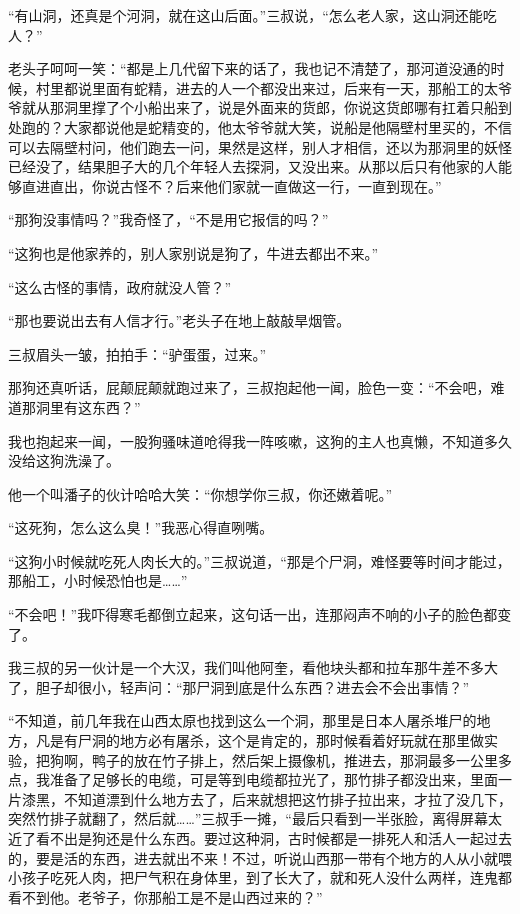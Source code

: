 “有山洞，还真是个河洞，就在这山后面。”三叔说，“怎么老人家，这山洞还能吃人？”

老头子呵呵一笑：“都是上几代留下来的话了，我也记不清楚了，那河道没通的时候，村里都说里面有蛇精，进去的人一个都没出来过，后来有一天，那船工的太爷爷就从那洞里撑了个小船出来了，说是外面来的货郎，你说这货郎哪有扛着只船到处跑的？大家都说他是蛇精变的，他太爷爷就大笑，说船是他隔壁村里买的，不信可以去隔壁村问，他们跑去一问，果然是这样，别人才相信，还以为那洞里的妖怪已经没了，结果胆子大的几个年轻人去探洞，又没出来。从那以后只有他家的人能够直进直出，你说古怪不？后来他们家就一直做这一行，一直到现在。”

“那狗没事情吗？”我奇怪了，“不是用它报信的吗？”

“这狗也是他家养的，别人家别说是狗了，牛进去都出不来。”

“这么古怪的事情，政府就没人管？”

“那也要说出去有人信才行。”老头子在地上敲敲旱烟管。

三叔眉头一皱，拍拍手：“驴蛋蛋，过来。”

那狗还真听话，屁颠屁颠就跑过来了，三叔抱起他一闻，脸色一变：“不会吧，难道那洞里有这东西？”

我也抱起来一闻，一股狗骚味道呛得我一阵咳嗽，这狗的主人也真懒，不知道多久没给这狗洗澡了。

他一个叫潘子的伙计哈哈大笑：“你想学你三叔，你还嫩着呢。”

“这死狗，怎么这么臭！”我恶心得直咧嘴。

“这狗小时候就吃死人肉长大的。”三叔说道，“那是个尸洞，难怪要等时间才能过，那船工，小时候恐怕也是……”

“不会吧！”我吓得寒毛都倒立起来，这句话一出，连那闷声不响的小子的脸色都变了。

我三叔的另一伙计是一个大汉，我们叫他阿奎，看他块头都和拉车那牛差不多大了，胆子却很小，轻声问：“那尸洞到底是什么东西？进去会不会出事情？”

“不知道，前几年我在山西太原也找到这么一个洞，那里是日本人屠杀堆尸的地方，凡是有尸洞的地方必有屠杀，这个是肯定的，那时候看着好玩就在那里做实验，把狗啊，鸭子的放在竹子排上，然后架上摄像机，推进去，那洞最多一公里多点，我准备了足够长的电缆，可是等到电缆都拉光了，那竹排子都没出来，里面一片漆黑，不知道漂到什么地方去了，后来就想把这竹排子拉出来，才拉了没几下，突然竹排子就翻了，然后就……”三叔手一摊，“最后只看到一半张脸，离得屏幕太近了看不出是狗还是什么东西。要过这种洞，古时候都是一排死人和活人一起过去的，要是活的东西，进去就出不来！不过，听说山西那一带有个地方的人从小就喂小孩子吃死人肉，把尸气积在身体里，到了长大了，就和死人没什么两样，连鬼都看不到他。老爷子，你那船工是不是山西过来的？”

